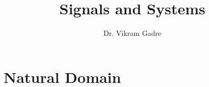 \documentclass{scrbook}
\title{\Huge Signals and Systems}
\author{\Large Dr. Vikram Gadre}
\newcommand{\blankpage}{\newpage\hbox{}\thispagestyle{empty}\newpage}
\begin{document}
\frontmatter

\maketitle

\begin{comment}
\newpage
\begin{fullwidth}
~\vfill
\thispagestyle{empty}
\setlength{\parindent}{0pt}
\setlength{\parskip}{\baselineskip}
Copyright \copyright\ \the\year\ \thanklessauthor

\par\smallcaps{Published by \thanklesspublisher}

\par\smallcaps{tufte-latex.googlecode.com}

\par Licensed under the Apache License, Version 2.0 (the ``License''); you may not
use this file except in compliance with the License. You may obtain a copy
of the License at \url{http://www.apache.org/licenses/LICENSE-2.0}. Unless
required by applicable law or agreed to in writing, software distributed
under the License is distributed on an \smallcaps{``AS IS'' BASIS, WITHOUT
WARRANTIES OR CONDITIONS OF ANY KIND}, either express or implied. See the
License for the specific language governing permissions and limitations
under the License.\index{license}

\end{fullwidth}
\end{comment}
\tableofcontents

\listoffigures

\listoftables

\begin{comment}
\cleardoublepage
~\vfill
\begin{doublespace}
\noindent\fontsize{18}{22}\selectfont\itshape
\nohyphenation
Dedicated to those who appreciate \LaTeX{} 
and the work of \mbox{Edward R.~Tufte} 
and \mbox{Donald E.~Knuth}.
\end{doublespace}
\vfill
\vfill
\end{comment}

\cleardoublepage
\mainmatter

\part{Natural Domain}
\end{document}
